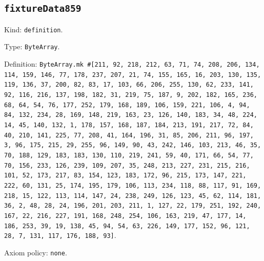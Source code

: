 \documentclass[11pt]{article}
\begin{document}
\subsection*{\texttt{fixtureData859}}
\noindent Kind: \texttt{definition}.\par
\noindent Type: \texttt{ByteArray}.\par
\noindent Definition: \texttt{ByteArray.mk \#[211, 92, 218, 212, 63, 71, 74, 208, 206, 134, 114, 159, 146, 77, 178, 237, 207, 21, 74, 155, 165, 16, 203, 130, 135, 119, 136, 37, 200, 82, 83, 17, 103, 66, 206, 255, 130, 62, 233, 141, 92, 116, 216, 137, 198, 182, 31, 219, 75, 187, 9, 202, 182, 165, 236, 68, 64, 54, 76, 177, 252, 179, 168, 189, 106, 159, 221, 106, 4, 94, 84, 132, 234, 28, 169, 148, 219, 163, 23, 126, 140, 183, 34, 48, 224, 14, 45, 140, 132, 1, 178, 157, 168, 187, 184, 213, 191, 217, 72, 84, 40, 210, 141, 225, 77, 208, 41, 164, 196, 31, 85, 206, 211, 96, 197, 3, 96, 175, 215, 29, 255, 96, 149, 90, 43, 242, 146, 103, 213, 46, 35, 70, 188, 129, 183, 183, 130, 110, 219, 241, 59, 40, 171, 66, 54, 77, 70, 156, 233, 126, 239, 109, 207, 35, 248, 213, 227, 231, 215, 216, 101, 52, 173, 217, 83, 154, 123, 183, 172, 96, 215, 173, 147, 221, 222, 60, 131, 25, 174, 195, 179, 106, 113, 234, 118, 88, 117, 91, 169, 218, 15, 122, 113, 114, 147, 24, 238, 249, 126, 123, 45, 62, 114, 181, 36, 2, 48, 28, 24, 196, 201, 203, 211, 1, 127, 22, 179, 251, 192, 240, 167, 22, 216, 227, 191, 168, 248, 254, 106, 163, 219, 47, 177, 14, 186, 253, 39, 19, 138, 45, 94, 54, 63, 226, 149, 177, 152, 96, 121, 28, 7, 131, 117, 176, 188, 93]}.\par
\noindent Axiom policy: \texttt{none}.\par
\end{document}
